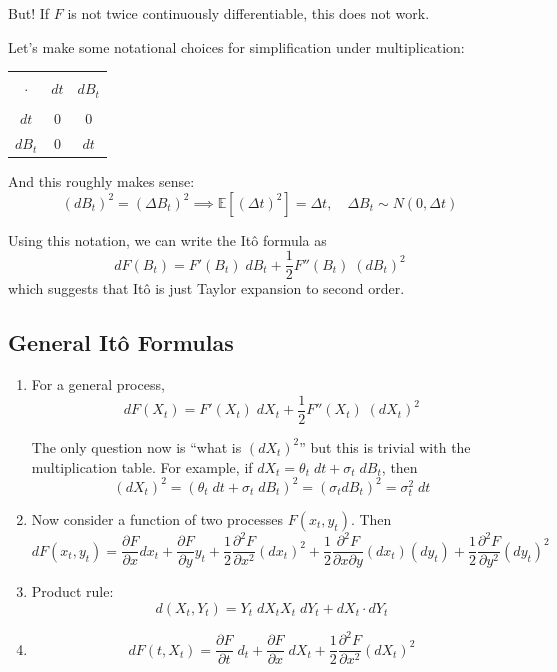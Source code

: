 \documentclass[12pt]{report}
\newcommand{\E}{\mathbb{E}}
\begin{document}
    But! If $F$ is not twice continuously differentiable, this does not work. 

    Let's make some notational choices for simplification under multiplication:
    \begin{center}
        \begin{tabular}{|c|cc|}
            \hline\\ 
            $\cdot$ & $dt$ & $dB_t$\\
            \hline\\
            $dt$ & $0$ & $0$\\
            $dB_t$ & $0$ & $dt$\\
            \hline
        \end{tabular}
    \end{center}

    And this roughly makes sense:
    \[(dB_t)^2 = (\Delta B_t)^2 \implies \E[(\Delta t)^2] = \Delta t, \quad \Delta B_t \sim N(0, \Delta t)\]

    Using this notation, we can write the Itô formula as
    \[dF(B_t) = F'(B_t) \;dB_t + \frac{1}{2}F''(B_t)\; (dB_t)^2\]
    which suggests that Itô is just Taylor expansion to second order. 

\subsection{General Itô Formulas}
    \begin{enumerate}
        \item For a general process, 
        \[dF(X_t) = F'(X_t) \; dX_t + \frac{1}{2} F''(X_t) \; (dX_t)^2\]

        The only question now is ``what is $(dX_t)^2$'' but this is trivial with the multiplication table. For example, if $dX_t = \theta_t \; dt + \sigma_t \; dB_t$, then 
        \[(dX_t)^2 = (\theta_t\; dt + \sigma_t \; dB_t)^2 = (\sigma_t dB_t)^2 = \sigma_t^2\; dt\] 

        \item Now consider a function of two processes $F(x_t, y_t)$. Then
        \[dF(x_t, y_t) = \frac{\partial F}{\partial x} dx_t +  \frac{\partial F}{\partial y} y_t + \frac{1}{2} \frac{\partial^2 F}{\partial x^2}(dx_t)^2 + \frac{1}{2} \frac{\partial^2 F}{\partial x \partial y}(dx_t) (dy_t) + \frac{1}{2} \frac{\partial^2 F}{\partial y^2}(dy_t)^2\]

        \item Product rule:
        \[d(X_t, Y_t) = Y_t \;dX_t X_t\; dY_t + dX_t \cdot dY_t\]

        \item \[dF(t, X_t) = \frac{\partial F}{\partial t} \; d_t + \frac{\partial F}{\partial x} \; dX_t + \frac{1}{2} \frac{\partial^2 F}{\partial x^2}(dX_t)^2\]
    \end{enumerate}
\end{document}
